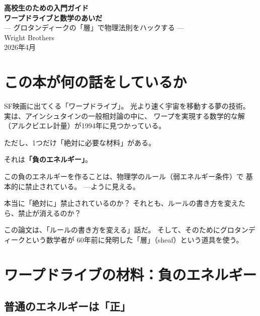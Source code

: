 \documentclass[12pt,a4paper]{article}
\begin{document}
\begin{center}
{\LARGE\bfseries 高校生のための入門ガイド}\\[0.5cm]
{\Large\bfseries ワープドライブと数学のあいだ}\\[0.3cm]
{\large --- グロタンディークの「層」で物理法則をハックする ---}\\[1.5cm]
{\large Wright Brothers}\\[0.3cm]
{2026年4月}
\end{center}

\vspace{1cm}

\tableofcontents

\newpage

\section{この本が何の話をしているか}

SF映画に出てくる「ワープドライブ」。
光より速く宇宙を移動する夢の技術。
実は、アインシュタインの一般相対論の中に、
ワープを実現する数学的な解（アルクビエレ計量）が1994年に見つかっている。

ただし、1つだけ「絶対に必要な材料」がある。

それは\textbf{「負のエネルギー」}。

この負のエネルギーを作ることは、物理学のルール（弱エネルギー条件）で
基本的に禁止されている。
---ように見える。

本当に「絶対に」禁止されているのか？
それとも、ルールの書き方を変えたら、禁止が消えるのか？

この論文は、「ルールの書き方を変える」話だ。
そして、そのためにグロタンディークという数学者が
60年前に発明した「層」（sheaf）という道具を使う。

\section{ワープドライブの材料：負のエネルギー}

\subsection{普通のエネルギーは「正」}
\end{document}

